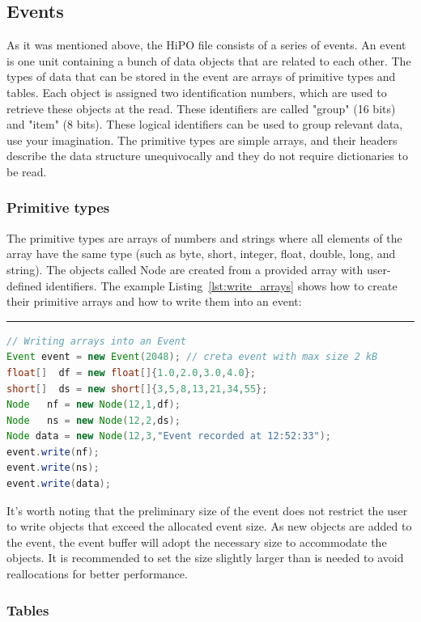 \subsection{Events}

As it was mentioned above, the HiPO file consists of a series of events. An event is one unit containing a bunch of data objects that are related to each other. The types of data that can be stored in the event are arrays of primitive types and tables. Each object is assigned two identification numbers, which are used to 
retrieve these objects at the read. These identifiers are called "group" (16 bits) and "item" (8 bits). These logical identifiers can be used to group relevant data, use your imagination. The primitive types are simple arrays, and their headers describe the data structure unequivocally and they do not require dictionaries to be read. 

\subsubsection{Primitive types}

The primitive types are arrays of numbers and strings where all elements of the array have the same type (such as byte, short, integer, float, double, long, and string). The objects 
called Node are created from a provided array with user-defined identifiers. The example Listing~\ref{lst:write_arrays} shows how to create their primitive arrays and how to write them into an event:
\rule{16.5cm}{0.4pt}
\begin{lstlisting}[language=java, caption=Java example to create and write primitive types into an event, label=lst:write_arrays]
// Writing arrays into an Event
Event event = new Event(2048); // creta event with max size 2 kB
float[]  df = new float[]{1.0,2.0,3.0,4.0};
short[]  ds = new short[]{3,5,8,13,21,34,55};
Node   nf = new Node(12,1,df);
Node   ns = new Node(12,2,ds);
Node data = new Node(12,3,"Event recorded at 12:52:33"); 
event.write(nf);
event.write(ns);
event.write(data);
\end{lstlisting}

It's worth noting that the preliminary size of the event does not restrict the user to write objects that exceed the allocated event size. As new objects are added to the event, the event buffer 
will adopt the necessary size to accommodate the objects. It is recommended to set the size slightly larger than is needed to avoid reallocations for better performance.

\subsubsection{Tables}

